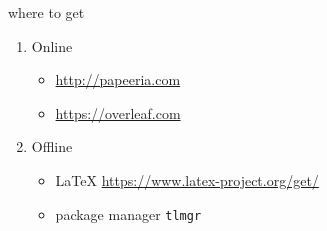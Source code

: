 \begin{frame}[fragile]{where to get}
\begin{enumerate}
    \item Online
    \begin{itemize}
        \item \url{http://papeeria.com}
        \item \url{https://overleaf.com}
    \end{itemize}
    \item Offline
    \begin{itemize}
        \item \LaTeX{} \url{https://www.latex-project.org/get/}
        \item package manager \verb'tlmgr'
    \end{itemize}
\end{enumerate}
     
\end{frame}






